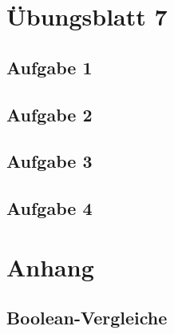 \documentclass[aspectratio=169,usepdftitle=true,11pt,ngerman,t]{beamer}
\subtitle{Tutorium 8}
\date{06. Dezember 2024}
\begin{document}
\section[Übungsblatt 7]{Übungsblatt 7}

\subsection{Aufgabe 1}
% 

\subsection{Aufgabe 2}
% 

\subsection{Aufgabe 3}
% 

\subsection{Aufgabe 4}
% 

\section[Ich muss noch ein wenig schimpfen...]{Anhang}

\subsection{Boolean-Vergleiche}


\end{document}
